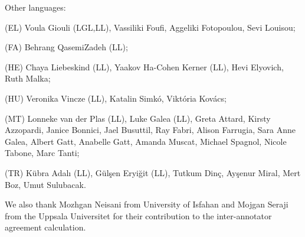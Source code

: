 \documentclass[output=paper,modfonts]{langscibook}
\begin{document}
\noindent Other languages:
 \begin{sitem}
 \item (EL) Voula Giouli (LGL,LL), Vassiliki Foufi, Aggeliki Fotopoulou, Sevi Loui\-sou;
 \item (FA) Behrang QasemiZadeh (LL);
 \item (HE) Chaya Liebeskind (LL), Yaakov Ha-Cohen Kerner (LL), Hevi Elyovich, Ruth Malka;
 \item (HU) Veronika Vincze (LL), Katalin Simkó, Viktória Kovács;
 \item (MT) Lonneke van der Plas (LL), Luke Galea (LL), Greta Attard, Kirsty Azzopardi, Janice Bonnici, Jael Busuttil, Ray Fabri, Alison Farrugia, Sara Anne Galea, Albert Gatt, Anabelle Gatt, Amanda Muscat,  Michael Spagnol, Nicole Tabone, Marc Tanti;
 \item (TR) Kübra Adalı (LL), Gülşen Eryiğit (LL), Tutkum Dinç, Ayşenur Miral, Mert Boz, Umut Sulubacak.
 \end{sitem}
 
We also thank Mozhgan Neisani from University of Isfahan and Mojgan Seraji from the Uppsala Universitet for their contribution to the inter-annotator agreement calculation.

\end{document}
